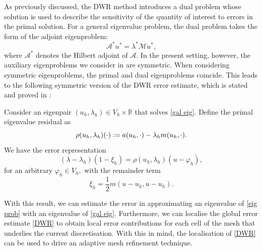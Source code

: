 As previously discussed, the DWR method introduces a dual problem whose solution is used to describe the sensitivity of the quantity of interest to errors in the primal solution. For a general eigenvalue problem, the dual problem takes the form of the adjoint eigenproblem:
\begin{equation} \label{dual eig}
    \mathcal{A}^* u^* = \lambda^*\mathcal{M}u^*, 
\end{equation}
where $\mathcal{A}^*$ denotes the Hilbert adjoint of $\mathcal{A}$. In the present setting, however, the auxiliary eigenproblems we consider in  are symmetric. When considering symmetric eigenproblems, the primal and dual eigenproblems coincide. This leads to the following symmetric version of the DWR error estimate, which is stated and proved in \cite{Bangerth, Heuveline}:
\begin{corollary} \label{LemDWR}
    Consider an eigenpair $(u_h, \lambda_h) \in V_h \times \mathbb{R}$ that solves \eqref{gal eig}. 
    Define the primal eigenvalue residual as
    \begin{equation} \label{resid}
        \rho(u_h, \lambda_h)(\cdot) \vcentcolon= a(u_h, \cdot) - \lambda_h m(u_h, \cdot).
    \end{equation}
    We have the error representation
    \begin{equation} \label{DWR}
        (\lambda - \lambda_h)(1 - \xi_h) = \rho(u_h, \lambda_h)(u - \varphi_h),
    \end{equation}
    for an arbitrary $\varphi_h \in V_h,$ with the remainder term
    \begin{equation} \label{remain}
        \xi_h = \frac{1}{2} m(u-u_h, u-u_h).
    \end{equation}

\end{corollary}


With this result, we can estimate the error in approximating an eigenvalue of \eqref{eig prob} with an eigenvalue of \eqref{gal eig}. Furthermore, we can localise the global error estimate \eqref{DWR} to obtain local error contributions for each cell of the mesh that underlies the current discretisation. With this in mind, the localisation of \eqref{DWR} can be used to drive an adaptive mesh refinement technique. 




